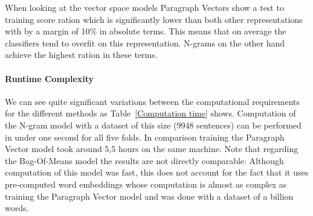 When looking at the vector space models Paragraph Vectors show a test to training score ration which is significantly lower than both other representations with by a margin of 10\% in absolute terms. This means that on average the classifiers tend to overfit on this representation. N-grams on the other hand achieve the highest ration in these terms.


\paragraph{Runtime Complexity}
\label{par:Runtime Complexity}

We can see quite significant variations between the computational requirements for the different methods as Table~\ref{Computation time} shows. Computation of the N-gram model with a dataset of this size (9948 sentences) can be performed in under one second for all five folds. In comparison training the Paragraph Vector model took around 5,5 hours on the same machine. Note that regarding the Bag-Of-Means model the results are not directly comparable: Although computation of this model was fast, this does not account for the fact that it uses pre-computed word embeddings whose computation is almost as complex as training the Paragraph Vector model and was done with a dataset of a billion words.


